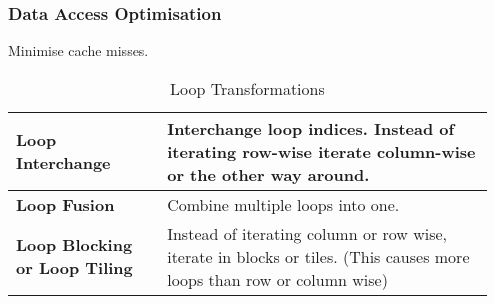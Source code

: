 		\subsubsection{Data Access Optimisation }		
			Minimise cache misses.
			
			\begin{table}[H]
				\centering
				\begin{tabular}{|p{0.3\linewidth}|p{0.65\linewidth}|}
					\hline
					\textbf{Loop Interchange}
						& Interchange loop indices. Instead of iterating row-wise iterate column-wise or the other way around.\\
					\hline
					\textbf{Loop Fusion}
						& Combine multiple loops into one. \\
					\hline
					\textbf{Loop Blocking or Loop Tiling}
						& Instead of iterating column or row wise, iterate in blocks or tiles. (This causes more loops than row or column wise)\\
					\hline
				\end{tabular}
				\caption{Loop Transformations}
			\end{table}
			
